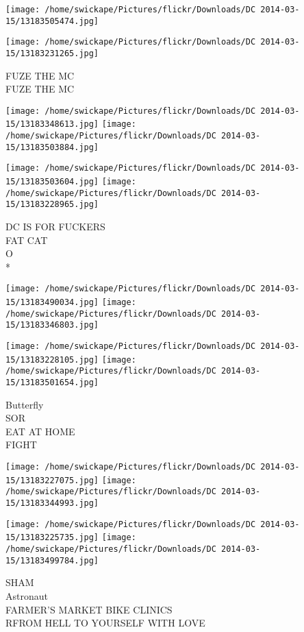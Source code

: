 \documentclass[10pt,letterpaper]{article}
\begin{document}
\texttt{[image: /home/swickape/Pictures/flickr/Downloads/DC 2014-03-15/13183505474.jpg]}

\vspace{0.25in}
\texttt{[image: /home/swickape/Pictures/flickr/Downloads/DC 2014-03-15/13183231265.jpg]}

FUZE THE MC\\
FUZE THE MC\\
\pagebreak

\texttt{[image: /home/swickape/Pictures/flickr/Downloads/DC 2014-03-15/13183348613.jpg]}
\texttt{[image: /home/swickape/Pictures/flickr/Downloads/DC 2014-03-15/13183503884.jpg]}

\texttt{[image: /home/swickape/Pictures/flickr/Downloads/DC 2014-03-15/13183503604.jpg]}
\texttt{[image: /home/swickape/Pictures/flickr/Downloads/DC 2014-03-15/13183228965.jpg]}

DC IS FOR FUCKERS\\
FAT CAT\\
O\\
*\\
\pagebreak

\texttt{[image: /home/swickape/Pictures/flickr/Downloads/DC 2014-03-15/13183490034.jpg]}
\texttt{[image: /home/swickape/Pictures/flickr/Downloads/DC 2014-03-15/13183346803.jpg]}

\texttt{[image: /home/swickape/Pictures/flickr/Downloads/DC 2014-03-15/13183228105.jpg]}
\texttt{[image: /home/swickape/Pictures/flickr/Downloads/DC 2014-03-15/13183501654.jpg]}

Butterfly\\
SOR\\
EAT AT HOME\\
FIGHT\\
\pagebreak

\texttt{[image: /home/swickape/Pictures/flickr/Downloads/DC 2014-03-15/13183227075.jpg]}
\texttt{[image: /home/swickape/Pictures/flickr/Downloads/DC 2014-03-15/13183344993.jpg]}

\texttt{[image: /home/swickape/Pictures/flickr/Downloads/DC 2014-03-15/13183225735.jpg]}
\texttt{[image: /home/swickape/Pictures/flickr/Downloads/DC 2014-03-15/13183499784.jpg]}

SHAM\\
Astronaut\\
FARMER'S MARKET BIKE CLINICS\\
RFROM HELL TO YOURSELF WITH LOVE\\
\pagebreak
\end{document}
